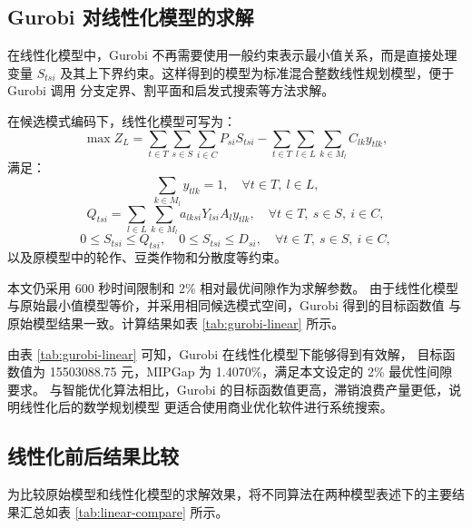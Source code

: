 \documentclass[12pt,a4paper]{ctexart}
\begin{document}
\subsection{Gurobi 对线性化模型的求解}

在线性化模型中，Gurobi 不再需要使用一般约束表示最小值关系，而是直接处理变量
$S_{tsi}$ 及其上下界约束。这样得到的模型为标准混合整数线性规划模型，便于 Gurobi 调用
分支定界、割平面和启发式搜索等方法求解。

在候选模式编码下，线性化模型可写为：
\[
\max Z_L=
\sum_{t\in T}\sum_{s\in S}\sum_{i\in C}P_{si}S_{tsi}
-
\sum_{t\in T}\sum_{l\in L}\sum_{k\in M_l}C_{lk}y_{tlk},
\]
满足：
\[
\sum_{k\in M_l}y_{tlk}=1,
\quad \forall t\in T,\ l\in L,
\]
\[
Q_{tsi}=\sum_{l\in L}\sum_{k\in M_l}a_{lksi}Y_{lsi}A_l y_{tlk},
\quad \forall t\in T,\ s\in S,\ i\in C,
\]
\[
0\leq S_{tsi}\leq Q_{tsi},\quad
0\leq S_{tsi}\leq D_{si},
\quad \forall t\in T,\ s\in S,\ i\in C,
\]
以及原模型中的轮作、豆类作物和分散度等约束。

本文仍采用 600 秒时间限制和 2\% 相对最优间隙作为求解参数。
由于线性化模型与原始最小值模型等价，并采用相同候选模式空间，Gurobi 得到的目标函数值
与原始模型结果一致。计算结果如表 \ref{tab:gurobi-linear} 所示。

\begin{table}[htbp]
\centering
\caption{Gurobi 对线性化模型的计算结果}
\label{tab:gurobi-linear}
\small
\setlength{\tabcolsep}{4pt}
\end{table}

由表 \ref{tab:gurobi-linear} 可知，Gurobi 在线性化模型下能够得到有效解，
目标函数值为 15503088.75 元，MIPGap 为 1.4070\%，满足本文设定的 2\% 最优性间隙要求。
与智能优化算法相比，Gurobi 的目标函数值更高，滞销浪费产量更低，说明线性化后的数学规划模型
更适合使用商业优化软件进行系统搜索。

\subsection{线性化前后结果比较}

为比较原始模型和线性化模型的求解效果，将不同算法在两种模型表述下的主要结果汇总如表
\ref{tab:linear-compare} 所示。
\end{document}

